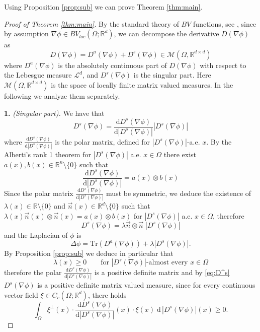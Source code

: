 \documentclass[11pt, twoside, reqno]{amsart}
\newcounter{assu}
\theoremstyle{definition} \newtheorem{definition}{Definition}[section]
\theoremstyle{definition} \newtheorem{remark}[definition]{Remark}
\theoremstyle{plain} \newtheorem{lemma}[definition]{Lemma}
\theoremstyle{plain} \newtheorem{proposition}[definition]{Proposition}
\theoremstyle{plain} \newtheorem{theorem}[definition]{Theorem}
\theoremstyle{plain} \newtheorem{corollary}[definition]{Corollary}
\theoremstyle{definition} \newtheorem{example}[definition]{Example}
\theoremstyle{plain} \newtheorem{claim}[clai]{Claim}
\theoremstyle{definition} \newtheorem{assumption}[definition]{Assumption}
\newcommand{\1}{\mathbbm 1}
\numberwithin{equation}{section} %
\theoremstyle{plain} \newtheorem*{theorem*}{Theorem}
\theoremstyle{plain} \newtheorem{mthm}[maintheorem]{Main Theorem}
\theoremstyle{plain} \newtheorem*{mthm*}{Main Theorem}
\theoremstyle{plain} \newtheorem*{conjecture*}{Conjecture}
\theoremstyle{plain} \newtheorem{conjecture}[definition]{Conjecture}
\theoremstyle{plain} \newtheorem*{problem*}{Problem}
\begin{document}
\vspace{0.3cm}
Using Proposition \ref{prop:sub} we can prove Theorem \ref{thm:main}.
\begin{proof}[Proof of Theorem \ref{thm:main}]
By the standard theory of $BV$ functions, see \cite{AFP_book}, since by assumption $\nabla \phi \in BV_{loc}(\Omega; \mathbb R^d)$, we can decompose the derivative $D (\nabla \phi)$ as
$$
D (\nabla \phi) = D^{a} (\nabla \phi) + D^s (\nabla \phi) \in \mathscr M(\Omega, \mathbb R^{d\times d})
$$
where $D^a(\nabla \phi)$ is the absolutely continuous part of $D(\nabla \phi)$ with respect to the Lebesgue measure $\mathscr L^d$, and $D^s(\nabla \phi)$ is the singular part. Here $\mathscr M(\Omega, \mathbb R^{d\times d})$ is the space of locally finite matrix valued measures. In the following we analyze them separately.

\vspace{0.5cm}
\textbf{1.} \emph{(Singular part).} We have that
$$
D^s(\nabla \phi) =  \frac{\mathrm{d} D^s(\nabla \phi) }{\mathrm{d} |D^s(\nabla \phi)|} |D^s(\nabla \phi)|
$$
where $ \frac{\mathrm{d} D^s(\nabla \phi) }{\mathrm{d} |D^s(\nabla \phi)|}$ is the polar matrix, defined for $|D^s(\nabla \phi)|$-a.e. $x$. By the Alberti's rank 1 theorem \cite[Theorem 3.94]{AFP_book} for $|D^s(\nabla \phi)|$ a.e. $x \in \Omega$ there exist $a(x), b(x) \in \mathbb R^n \setminus \{0\}$ such that
$$
 \frac{\mathrm{d} D^s(\nabla \phi) }{\mathrm{d} |D^s(\nabla \phi)|} = a(x) \otimes b(x)
$$
Since the polar matrix $ \frac{\mathrm{d} D^s(\nabla \phi) }{\mathrm{d} |D^s(\nabla \phi)|}$ must be symmetric, we deduce the existence of $\lambda(x) \in \mathbb R \setminus \{0\}$ and $\vec n(x) \in \mathbb R^d \setminus\{0\}$ such that $\lambda(x)\vec n(x)\otimes \vec n(x) = a(x) \otimes b(x)$ for $|D^s(\nabla \phi)|$ a.e. $x \in \Omega$, therefore
\begin{equation}\label{eq:D^s}
D^s(\nabla \phi) =  \lambda \vec n \otimes \vec n \;|D^s(\nabla \phi)|
\end{equation}
and the Laplacian of $\phi$ is 
$$
\Delta \phi = \mathrm{Tr}(D^a(\nabla \phi)) + \lambda |D^s(\nabla \phi)|.
$$
By Proposition \ref{prop:sub} we deduce in particular that 
$$
\lambda(x) \geq 0 \qquad \text{for $|D^s(\nabla \phi)|$-almost every $x \in \Omega$}
$$
therefore the polar $\frac{\mathrm{d} D^s(\nabla \phi) }{\mathrm{d} |D^s(\nabla \phi)|}$ is a positive definite matrix and by \eqref{eq:D^s} $D^s(\nabla \phi)$ is a positive definite matrix valued measure, since for every continuous vector field $\xi \in C_c(\Omega; \mathbb R^d)$, there holds
$$
\int_{\Omega} \xi^\perp(x) \cdot \frac{\mathrm{d} D^s(\nabla \phi) }{\mathrm{d} |D^s(\nabla \phi)|}(x) \cdot \xi(x) \; \mathrm{d}\, |D^s(\nabla \phi)|(x) \geq 0.
$$



\end{proof}
\end{document}
